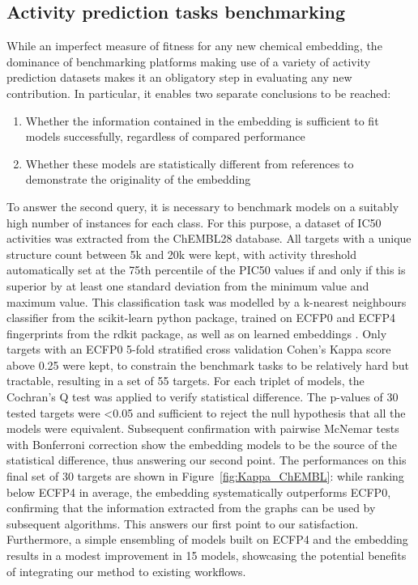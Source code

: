 \documentclass[doublespacing]{bmcart}
\begin{document}
\subsection*{Activity prediction tasks benchmarking}
While an imperfect measure of fitness for any new chemical embedding, the dominance of benchmarking platforms making use of a variety of activity prediction datasets makes it an obligatory step in evaluating any new contribution. In particular, it enables two separate conclusions to be reached:
\begin{enumerate}
\item Whether the information contained in the embedding is sufficient to fit models successfully, regardless of compared performance
\item Whether these models are statistically different from references to demonstrate the originality of the embedding
\end{enumerate}

To answer the second query, it is necessary to benchmark models on a suitably high number of instances for each class. For this purpose, a dataset of IC50 activities was extracted from the ChEMBL28 database. All targets with a unique structure count between 5k and 20k were kept, with activity threshold automatically set at the 75th percentile of the PIC50 values if and only if this is superior by at least one standard deviation from the minimum value and maximum value. This classification task was modelled by a k-nearest neighbours classifier from the scikit-learn python package\cite{scikit-learn}, trained on ECFP0 and ECFP4 fingerprints from the rdkit package\cite{LandrumRDKit}, as well as on learned embeddings . Only targets with an ECFP0 5-fold stratified cross validation Cohen's Kappa score above 0.25 were kept, to constrain the benchmark tasks to be relatively hard but tractable, resulting in a set of 55 targets. For each triplet of models, the Cochran's Q test was applied to verify statistical difference. The p-values of 30 tested targets were <0.05 and sufficient to reject the null hypothesis that all the models were equivalent. Subsequent confirmation with pairwise McNemar tests with Bonferroni correction show the embedding models to be the source of the statistical difference, thus answering our second point. The performances on this final set of 30 targets are shown in Figure~\ref{fig:Kappa_ChEMBL}: while ranking below ECFP4 in average, the embedding systematically outperforms ECFP0, confirming that the information extracted from the graphs can be used by subsequent algorithms. This answers our first point to our satisfaction. Furthermore, a simple ensembling of models built on ECFP4 and the embedding results in a modest improvement in 15 models, showcasing the potential benefits of integrating our method to existing workflows.
\end{document}
